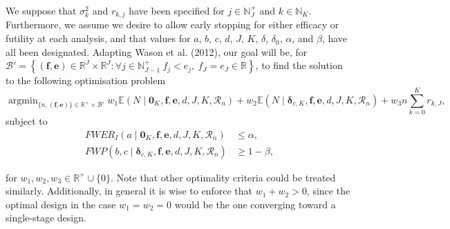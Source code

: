 \documentclass{article}
\numberwithin{equation}{section}
\theoremstyle{plain}
\DeclareMathOperator*{\argmin}{argmin}
\begin{document}
We suppose that $\sigma_k^2$ and $r_{k,j}$ have been specified for $j\in\mathbb{N}_J^+$ and $k\in\mathbb{N}_K$. Furthermore, we assume we desire to allow early stopping for either efficacy or futility at each analysis, and that values for $a$, $b$, $c$, $d$, $J$, $K$, $\delta$, $\delta_0$, $\alpha$, and $\beta$, have all been designated. Adapting Wason et al. (2012), our goal will be, for $\mathscr{B}'= \left\{ (\boldsymbol{f},\boldsymbol{e})\in\mathbb{R}^J\times\mathbb{R}^J : \forall j\in\mathbb{N}_{J-1}^+\ f_j< e_j,\ f_J=e_J\in\mathbb{R}\right\}$, to find the solution to the following optimisation problem
\begin{equation*}
\argmin_{\{n, (\boldsymbol{f}, \boldsymbol{e})\} \in \mathbb{R}^+\times\mathscr{B}'} w_1\mathbb{E}(N\mid\boldsymbol{0}_K,\boldsymbol{f},\boldsymbol{e},d,J,K,\mathscr{R}_n) + w_2\mathbb{E}(N\mid\boldsymbol{\delta}_{c,K},\boldsymbol{f},\boldsymbol{e},d,J,K,\mathscr{R}_n) + w_3n\sum_{k=0}^Kr_{k,J},
\end{equation*}\label{optcriteria}
subject to
\begin{align*}
FWER_I(a\mid\boldsymbol{0}_K, \boldsymbol{f},\boldsymbol{e},d,J,K,\mathscr{R}_n)&\le \alpha,\\
FWP(b,c\mid \boldsymbol{\delta}_{c,K},\boldsymbol{f},\boldsymbol{e},d,J,K,\mathscr{R}_n)&\ge 1-\beta,
\end{align*}

for $w_1,w_2,w_3\in\mathbb{R}^+\cup\{0\}$. Note that other optimality criteria could be treated similarly. Additionally, in general it is wise to enforce that $w_1+w_2>0$, since the optimal design in the case $w_1=w_2=0$ would be the one converging toward a single-stage design.
\end{document}
